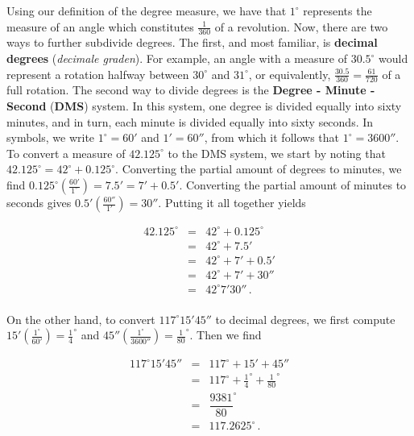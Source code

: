Using our definition of the degree measure, we have that $1^{\circ}$ represents the measure of an angle which constitutes $\frac{1}{360}$ of a revolution.  Now, there are two ways to further subdivide degrees.  The first, and most familiar, is \textbf{decimal degrees} (\textit{decimale graden}).  \ifvc For example, an angle with a measure of $30.5^{\circ}$ would represent a rotation halfway between $30^{\circ}$ and $31^{\circ}$, or equivalently, $\frac{30.5}{360} = \frac{61}{720}$ of a full rotation. \fi The second way to divide degrees is the \textbf{Degree - Minute - Second} (\textbf{DMS}) system.  In this system, one degree is divided equally into sixty minutes, and in turn, each minute is divided equally into sixty seconds.  \ifvc In symbols, we write $1^{\circ} = 60'$ and $1' = 60''$, from which it follows that  $1^{\circ} = 3600''$.  To convert a measure of $42.125^{\circ}$ to the DMS system, we start by noting that $42.125^{\circ} = 42^{\circ} + 0.125^{\circ}$. Converting the partial amount of degrees to minutes, we find $0.125^{\circ} \left( \frac{60'}{1^{\circ}} \right) = 7.5' = 7' + 0.5'$. Converting the partial amount of minutes to seconds gives  $0.5' \left(\frac{60''}{1'} \right) = 30''$.  Putting it all together yields 

\[ \begin{array}{rcl}

42.125^{\circ} & = &  42^{\circ} + 0.125^{\circ} \\
               & = & 42^{\circ} + 7.5' \\
               & = & 42^{\circ} + 7' + 0.5' \\
               & = & 42^{\circ} + 7' + 30'' \\
               & = & 42^{\circ} 7' 30''\,. \\ \end{array} \]
      
On the other hand, to convert $117^{\circ}15'45''$ to decimal degrees, we first compute $15' \left(\frac{1^{\circ}}{60'}\right) = \frac{1}{4}^{\circ}$ and $45'' \left(\frac{1^{\circ}}{3600''}\right) = \frac{1}{80}^{\circ}$. Then we find

\[ \begin{array}{rcl}

 117^{\circ}15'45'' & = & 117^{\circ} + 15' + 45'' \\ [5pt]
                    & = & 117^{\circ} + \frac{1}{4}^{\circ} + \frac{1}{80}^{\circ} \\ [5pt]
                    & = & \dfrac{9381}{80}^{\circ} \\ [5pt]
                    & = &  117.2625^{\circ}\,. \\ \end{array} \]
																				
